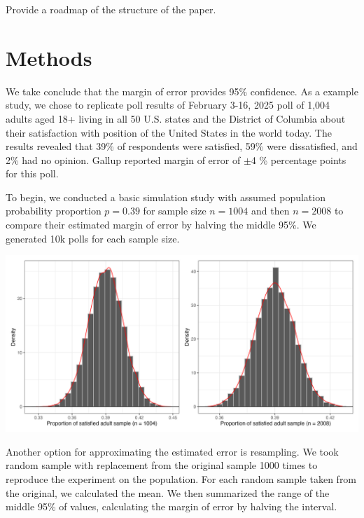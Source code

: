 \documentclass{article}\usepackage[]{graphicx}\usepackage[]{xcolor}
\newenvironment{Figure}
  {\par\medskip\noindent\minipage{\linewidth}}
  {\endminipage\par\medskip}
\begin{document}
\begin{multicols}{2}
Provide a roadmap of the structure of the paper. 



\section{Methods}
We take conclude that the margin of error provides 95\% confidence. As a example study, we chose to replicate poll results of February 3-16, 2025 poll of 1,004 adults aged 18+ living in all 50 U.S. states and the District of Columbia about their satisfaction with position of the United States in the world today. The results revealed that 39\% of respondents were satisfied, 59\% were dissatisfied, and 2\% had no opinion. Gallup reported margin of error of  $\pm$4 \% percentage points for this poll.

To begin, we conducted a basic simulation study with assumed population probability proportion $p=0.39$ for sample size $n=1004$ and then $n=2008$ to compare their estimated margin of error by halving the middle 95\%. We generated 10k polls for each sample size. 

\begin{Figure}
 \centering
 \includegraphics[width=\linewidth]{simulation.png}
 \label{fig:sim}
\end{Figure}

Another option for approximating the estimated error is resampling. We took random sample with replacement from the original sample 1000 times to reproduce the experiment on the population. For each random sample taken from the original, we calculated the mean. We then summarized the range of the middle 95\% of values, calculating the margin of error by halving the interval.


\end{multicols}
\end{document}
